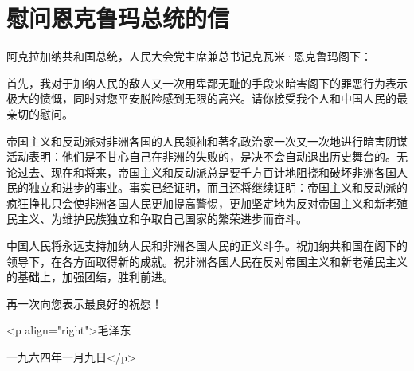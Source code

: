 \section[慰问恩克鲁玛总统的信（一九六四年一月九日）]{慰问恩克鲁玛总统的信}


阿克拉加纳共和国总统，人民大会党主席兼总书记克瓦米·恩克鲁玛阁下：

首先，我对于加纳人民的敌人又一次用卑鄙无耻的手段来暗害阁下的罪恶行为表示极大的愤慨，同时对您平安脱险感到无限的高兴。请你接受我个人和中国人民的最亲切的慰问。

帝国主义和反动派对非洲各国的人民领袖和著名政治家一次又一次地进行暗害阴谋活动表明：他们是不甘心自己在非洲的失败的，是决不会自动退出历史舞台的。无论过去、现在和将来，帝国主义和反动派总是要千方百计地阻挠和破坏非洲各国人民的独立和进步的事业。事实已经证明，而且还将继续证明：帝国主义和反动派的疯狂挣扎只会使非洲各国人民更加提高警惕，更加坚定地为反对帝国主义和新老殖民主义、为维护民族独立和争取自己国家的繁荣进步而奋斗。

中国人民将永远支持加纳人民和非洲各国人民的正义斗争。祝加纳共和国在阁下的领导下，在各方面取得新的成就。祝非洲各国人民在反对帝国主义和新老殖民主义的基础上，加强团结，胜利前进。

再一次向您表示最良好的祝愿！

<p align="right">毛泽东

一九六四年一月九日</p>


